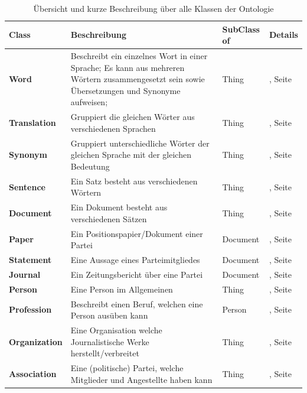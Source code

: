 \documentclass[
    11pt,
    latin1,
    a4paper,
    oneside
]{scrreprt}
\begin{document}
\begin{table}[H]
  \centering
  \begin{tabular}{ | l | p{4cm} | l | l| }
    \hline
    \textbf{Class} & \textbf{Beschreibung} & \textbf{SubClass of} & \textbf{Details} \\ \hline
    \textbf{Word} & Beschreibt ein einzelnes Wort in einer Sprache; Es kann aus mehreren W\"ortern zusammengesetzt sein sowie \"Ubersetzungen und Synonyme aufweisen; & Thing & \nameref{sec:class_word}, Seite \pageref{sec:class_word} \\ \hline
    \textbf{Translation} & Gruppiert die gleichen W\"orter aus verschiedenen Sprachen & Thing & \nameref{sec:class_translation}, Seite \pageref{sec:class_translation} \\ \hline
    \textbf{Synonym} & Gruppiert unterschiedliche W\"orter der gleichen Sprache mit der gleichen Bedeutung & Thing & \nameref{sec:class_synonym}, Seite \pageref{sec:class_synonym} \\ \hline
    \textbf{Sentence} & Ein Satz besteht aus verschiedenen W\"ortern & Thing & \nameref{sec:class_sentence}, Seite \pageref{sec:class_sentence} \\ \hline
    \textbf{Document} & Ein Dokument besteht aus verschiedenen S\"atzen & Thing & \nameref{sec:class_document}, Seite \pageref{sec:class_document} \\ \hline
    \textbf{Paper} & Ein Positionspapier/Dokument einer Partei & Document & \nameref{sec:class_paper}, Seite \pageref{sec:class_paper} \\ \hline
    \textbf{Statement} & Eine Aussage eines Parteimitgliedes & Document & \nameref{sec:class_statement}, Seite \pageref{sec:class_statement} \\ \hline
    \textbf{Journal} & Ein Zeitungsbericht \"uber eine Partei & Document & \nameref{sec:class_journal}, Seite \pageref{sec:class_journal} \\ \hline
    \textbf{Person} & Eine Person im Allgemeinen & Thing & \nameref{sec:class_person}, Seite \pageref{sec:class_person} \\ \hline
    \textbf{Profession} & Beschreibt einen Beruf, welchen eine Person aus\"uben kann & Person & \nameref{sec:class_profession}, Seite \pageref{sec:class_profession} \\ \hline
    \textbf{Organization} & Eine Organisation welche Journalistische Werke herstellt/verbreitet & Thing & \nameref{sec:class_organization}, Seite \pageref{sec:class_organization} \\ \hline
    \textbf{Association} & Eine (politische) Partei, welche Mitglieder und Angestellte haben kann & Thing & \nameref{sec:class_association}, Seite \pageref{sec:class_association} \\ \hline
  \end{tabular}
  \caption{\"Ubersicht und kurze Beschreibung \"uber alle Klassen der Ontologie}
  \label{tbl:classes}
\end{table}
\end{document}
